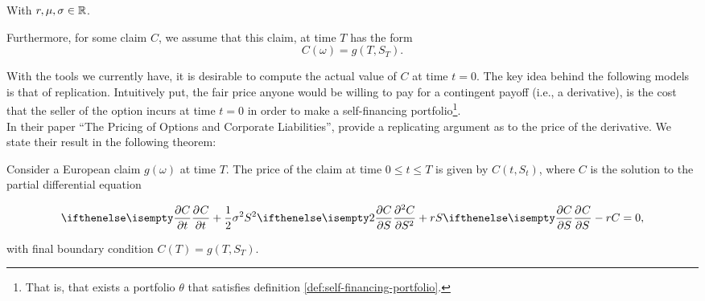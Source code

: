 \documentclass[../TGMAFFIRO.tex]{subfiles}
\begin{document}
With $r, \mu, \sigma \in \mathbb{R}$.

Furthermore, for some claim $C$, we assume that this claim, at time $T$ has the form
\begin{equation}
  C(\omega) = g(T, S_T).
\end{equation}

With the tools we currently have, it is desirable to compute the actual value of $C$ at time $t=0$. The key idea behind the following models is that of replication. Intuitively put, the fair price anyone would be willing to pay for a contingent payoff (i.e., a derivative), is the cost that the seller of the option incurs at time $t=0$ in order to make a self-financing portfolio\footnote{That is, that exists a portfolio $\theta$ that satisfies definition \ref{def:self-financing-portfolio}.}.\\

In their paper ``The Pricing of Options and Corporate Liabilities'',  provide a replicating argument as to the price of the derivative. We state their result in the following theorem:

\begin{theorem}
	Consider a European claim $g(\omega)$ at time $T$. The price of the claim at time $0\leq t\leq T$ is given by $C(t,S_t)$, where $C$ is the solution to the partial differential equation
	
	\begin{equation}\label{eq:black-scholes-formula}
		\partialwrt{C}{t} + \frac{1}{2}\sigma^2S^2\partialwrt[2]{C}{S} + rS\partialwrt{C}{S} - rC = 0,
	\end{equation}

with final boundary condition $C(T) = g(T, S_T)$.
\end{theorem}
\end{document}
